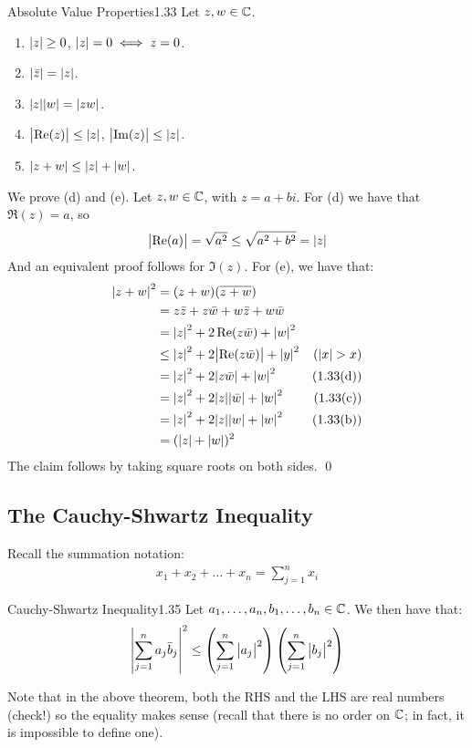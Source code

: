 \begin{theorem}{Absolute Value Properties}{1.33}
    Let $z, w \in \mathbb{C}$.
    \begin{enumerate}
        \item $\abs{z} \geq 0$, $\abs{z} = 0 \iff z = 0$. 
        \item $\abs{\bar{z}} = \abs{z}$.
        \item $\abs{z}\abs{w} = \abs{zw}$.
        \item $\abs{\Re(z)} \leq \abs{z}$, $\abs{\Im(z)} \leq \abs{z}$.
        \item $\abs{z + w} \leq \abs{z} + \abs{w}$.
    \end{enumerate}
\end{theorem}
\begin{nproof}
    We prove (d) and (e). Let $z, w \in \mathbb{C}$, with $z = a + bi$. For (d) we have that $\Re(z) = a$, so \begin{align*}
        \abs{\Re(a)} = \sqrt{a^2} \leq \sqrt{a^2 + b^2} = \abs{z}
    \end{align*}
    And an equivalent proof follows for $\Im(z)$. For (e), we have that:
    \begin{align*}
        \abs{z + w}^2 &= (z + w)(\overline{z + w})
        \\ &= z\bar{z} + z\bar{w} + w\bar{z} + w\bar{w}
        \\ &= \abs{z}^2 + 2\Re(z\bar{w}) + \abs{w}^2
        \\ &\leq \abs{z}^2 + 2\abs{\Re(z\bar{w})} + \abs{y}^2 & \text{($\abs{x} > x$)}
        \\ &= \abs{z}^2 + 2\abs{z\bar{w}} + \abs{w}^2 & \text{(1.33(d))}
        \\ &= \abs{z}^2 + 2\abs{z}\abs{\bar{w}} + \abs{w}^2 & \text{(1.33(c))}
        \\ &= \abs{z}^2 + 2\abs{z}\abs{w} + \abs{w}^2 & \text{(1.33(b))}
        \\ &= (\abs{z} + \abs{w})^2
    \end{align*}
The claim follows by taking square roots on both sides. \qed
\end{nproof}



\subsection{The Cauchy-Shwartz Inequality}
Recall the summation notation:
\begin{align*}
    x_1 + x_2 + \ldots + x_n = \sum_{j=1}^{n}x_i
\end{align*}
\begin{theorem}{Cauchy-Shwartz Inequality}{1.35}
    Let $a_1, \ldots, a_n, b_1, \ldots, b_n \in \mathbb{C}$. We then have that:
    \begin{align*}
        \abs{\sum_{j=1}^na_j\bar{b}_j}^2 \leq \left(\sum_{j=1}^n\abs{a_j}^2\right)\left(\sum_{j=1}^n\abs{b_j}^2\right)
    \end{align*}
\end{theorem}
\noindent Note that in the above theorem, both the RHS and the LHS are real numbers (check!) so the equality makes sense (recall that there is no order on $\mathbb{C}$; in fact, it is impossible to define one). 

